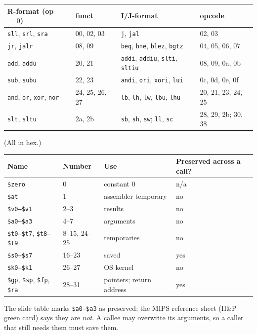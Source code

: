 \begin{center}
\small
\begin{tabular}{@{}llll@{}}
\toprule
R-format (op $=0$) & funct & I/J-format & opcode \\
\midrule
\texttt{sll}, \texttt{srl}, \texttt{sra} & 00, 02, 03 & \texttt{j}, \texttt{jal} & 02, 03 \\
\texttt{jr}, \texttt{jalr} & 08, 09 & \texttt{beq}, \texttt{bne}, \texttt{blez}, \texttt{bgtz} & 04, 05, 06, 07 \\
\texttt{add}, \texttt{addu} & 20, 21 & \texttt{addi}, \texttt{addiu}, \texttt{slti}, \texttt{sltiu} & 08, 09, 0a, 0b \\
\texttt{sub}, \texttt{subu} & 22, 23 & \texttt{andi}, \texttt{ori}, \texttt{xori}, \texttt{lui} & 0c, 0d, 0e, 0f \\
\texttt{and}, \texttt{or}, \texttt{xor}, \texttt{nor} & 24, 25, 26, 27 & \texttt{lb}, \texttt{lh}, \texttt{lw}, \texttt{lbu}, \texttt{lhu} & 20, 21, 23, 24, 25 \\
\texttt{slt}, \texttt{sltu} & 2a, 2b & \texttt{sb}, \texttt{sh}, \texttt{sw}; \texttt{ll}, \texttt{sc} & 28, 29, 2b; 30, 38 \\
\bottomrule
\end{tabular}
\end{center}
(All in hex.)

\begin{center}
\small
\begin{tabular}{@{}llll@{}}
\toprule
Name & Number & Use & Preserved across a call? \\
\midrule
\texttt{\$zero} & 0 & constant 0 & n/a \\
\texttt{\$at} & 1 & assembler temporary & no \\
\texttt{\$v0--\$v1} & 2--3 & results & no \\
\texttt{\$a0--\$a3} & 4--7 & arguments & no \\
\texttt{\$t0--\$t7}, \texttt{\$t8--\$t9} & 8--15, 24--25 & temporaries & no \\
\texttt{\$s0--\$s7} & 16--23 & saved & yes \\
\texttt{\$k0--\$k1} & 26--27 & OS kernel & no \\
\texttt{\$gp}, \texttt{\$sp}, \texttt{\$fp}, \texttt{\$ra} & 28--31 & pointers; return address & yes \\
\bottomrule
\end{tabular}
\end{center}
\begin{remark}
\slidefix{} The slide table marks \texttt{\$a0--\$a3} as preserved; the MIPS
reference sheet (H\&P green card) says they are \emph{not}. A callee may
overwrite its arguments, so a caller that still needs them must save them.
\end{remark}

